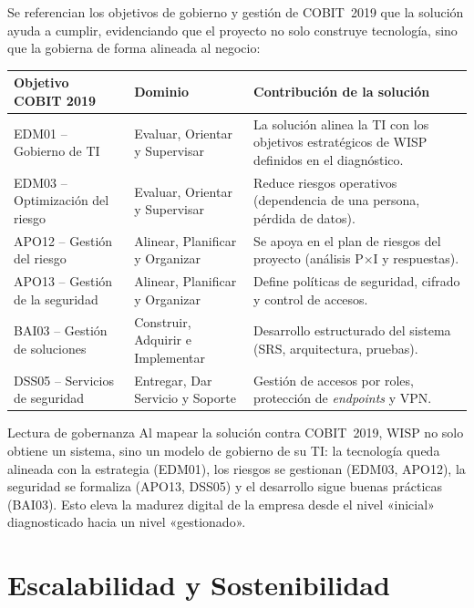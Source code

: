 Se referencian los objetivos de gobierno y gestión de COBIT~2019 que la solución ayuda
a cumplir, evidenciando que el proyecto no solo construye tecnología, sino que la
gobierna de forma alineada al negocio:

\begin{center}
\label{tab:cobit}
\begin{tabularx}{\textwidth}{L{3.4cm} L{3.6cm} X}
\toprule
\textbf{Objetivo COBIT 2019} & \textbf{Dominio} & \textbf{Contribución de la solución} \\
\midrule
EDM01 -- Gobierno de TI & Evaluar, Orientar y Supervisar &
La solución alinea la TI con los objetivos estratégicos de WISP definidos en el
diagnóstico. \\
EDM03 -- Optimización del riesgo & Evaluar, Orientar y Supervisar &
Reduce riesgos operativos (dependencia de una persona, pérdida de datos). \\
APO12 -- Gestión del riesgo & Alinear, Planificar y Organizar &
Se apoya en el plan de riesgos del proyecto (análisis P$\times$I y respuestas). \\
APO13 -- Gestión de la seguridad & Alinear, Planificar y Organizar &
Define políticas de seguridad, cifrado y control de accesos. \\
BAI03 -- Gestión de soluciones & Construir, Adquirir e Implementar &
Desarrollo estructurado del sistema (SRS, arquitectura, pruebas). \\
DSS05 -- Servicios de seguridad & Entregar, Dar Servicio y Soporte &
Gestión de accesos por roles, protección de \textit{endpoints} y VPN. \\
\bottomrule
\end{tabularx}
\end{center}

\begin{upeubox}{Lectura de gobernanza}
Al mapear la solución contra COBIT~2019, WISP no solo obtiene un sistema, sino un
modelo de gobierno de su TI: la tecnología queda alineada con la estrategia (EDM01),
los riesgos se gestionan (EDM03, APO12), la seguridad se formaliza (APO13, DSS05) y el
desarrollo sigue buenas prácticas (BAI03). Esto eleva la madurez digital de la empresa
desde el nivel «inicial» diagnosticado hacia un nivel «gestionado».
\end{upeubox}

\section{Escalabilidad y Sostenibilidad}
\label{sec:escalabilidad}

